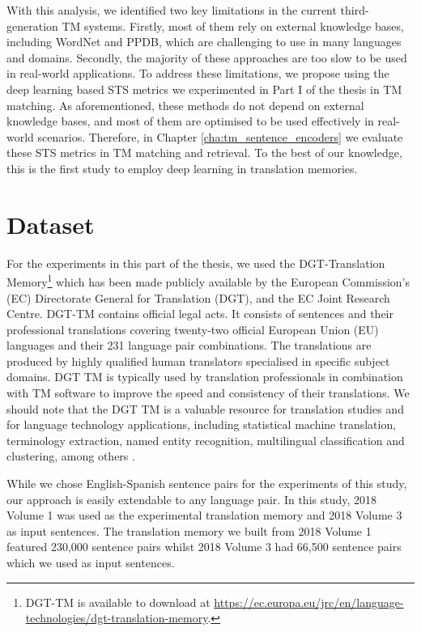 With this analysis, we identified two key limitations in the current third-generation TM systems. Firstly, most of them rely on external knowledge bases, including WordNet and PPDB, which are challenging to use in many languages and domains. Secondly, the majority of these approaches are too slow to be used in real-world applications. To address these limitations, we propose using the deep learning based STS metrics we experimented in Part I of the thesis in TM matching. As aforementioned, these methods do not depend on external knowledge bases, and most of them are optimised to be used effectively in real-world scenarios. Therefore, in Chapter \ref{cha:tm_sentence_encoders} we evaluate these STS metrics in TM matching and retrieval. To the best of our knowledge, this is the first study to employ deep learning in translation memories. 




\section{Dataset}
\label{sec:tm_data}
For the experiments in this part of the thesis, we used the DGT-Translation Memory\footnote{DGT-TM is available to download at \url{https://ec.europa.eu/jrc/en/language-technologies/dgt-translation-memory}.} which has been made publicly available by the European Commission’s (EC) Directorate General for Translation (DGT), and the EC Joint Research Centre. DGT-TM contains official legal acts. It consists of sentences and their professional translations covering twenty-two official European Union (EU) languages and their 231 language pair combinations. The translations are produced by highly qualified human translators specialised in specific subject domains. DGT TM is typically used by translation professionals in combination with TM software to improve the speed and consistency of their translations. We should note that the DGT TM is a valuable resource for translation studies and for language technology applications, including statistical machine translation, terminology extraction, named entity recognition, multilingual classification and clustering, among others \autocite{aker-etal-2013-extracting, besacier-schwartz-2015-automated}. 

While we chose English-Spanish sentence pairs for the experiments of this study, our approach is easily extendable to any language pair. In this study, 2018 Volume 1 was used as the experimental translation memory and 2018 Volume 3 as input sentences. The translation memory we built from 2018 Volume 1 featured 230,000 sentence pairs whilst 2018 Volume 3 had 66,500 sentence pairs which we used as input sentences. 

